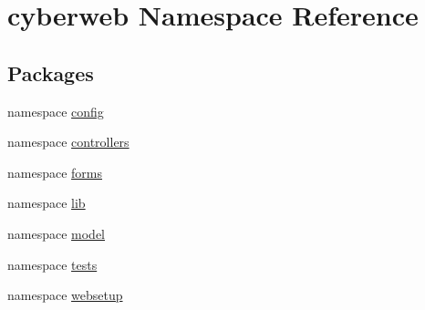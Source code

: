 \hypertarget{namespacecyberweb}{\section{cyberweb \-Namespace \-Reference}
\label{namespacecyberweb}
}
\subsection*{\-Packages}
\begin{DoxyCompactItemize}
\item 
namespace \hyperlink{namespacecyberweb_1_1config}{config}
\item 
namespace \hyperlink{namespacecyberweb_1_1controllers}{controllers}
\item 
namespace \hyperlink{namespacecyberweb_1_1forms}{forms}
\item 
namespace \hyperlink{namespacecyberweb_1_1lib}{lib}
\item 
namespace \hyperlink{namespacecyberweb_1_1model}{model}
\item 
namespace \hyperlink{namespacecyberweb_1_1tests}{tests}
\item 
namespace \hyperlink{namespacecyberweb_1_1websetup}{websetup}
\end{DoxyCompactItemize}
